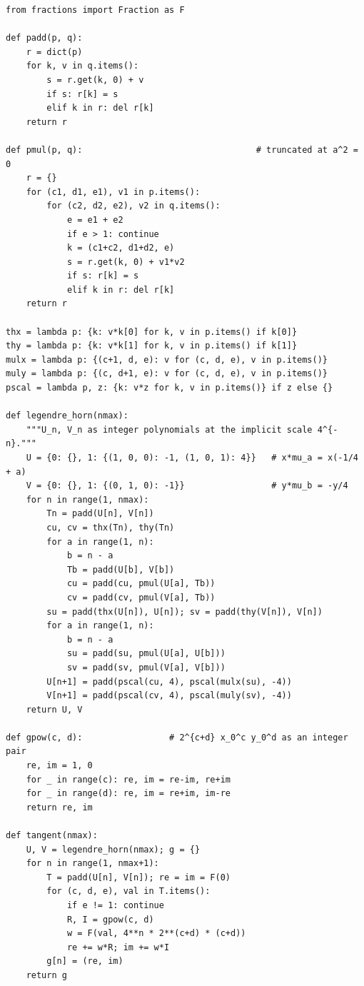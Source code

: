 \documentclass[12pt]{amsart}
\theoremstyle{definition}
\theoremstyle{remark}
\begin{document}
{\small
\begin{verbatim}
from fractions import Fraction as F

def padd(p, q):
    r = dict(p)
    for k, v in q.items():
        s = r.get(k, 0) + v
        if s: r[k] = s
        elif k in r: del r[k]
    return r

def pmul(p, q):                                  # truncated at a^2 = 0
    r = {}
    for (c1, d1, e1), v1 in p.items():
        for (c2, d2, e2), v2 in q.items():
            e = e1 + e2
            if e > 1: continue
            k = (c1+c2, d1+d2, e)
            s = r.get(k, 0) + v1*v2
            if s: r[k] = s
            elif k in r: del r[k]
    return r

thx = lambda p: {k: v*k[0] for k, v in p.items() if k[0]}
thy = lambda p: {k: v*k[1] for k, v in p.items() if k[1]}
mulx = lambda p: {(c+1, d, e): v for (c, d, e), v in p.items()}
muly = lambda p: {(c, d+1, e): v for (c, d, e), v in p.items()}
pscal = lambda p, z: {k: v*z for k, v in p.items()} if z else {}

def legendre_horn(nmax):
    """U_n, V_n as integer polynomials at the implicit scale 4^{-n}."""
    U = {0: {}, 1: {(1, 0, 0): -1, (1, 0, 1): 4}}   # x*mu_a = x(-1/4 + a)
    V = {0: {}, 1: {(0, 1, 0): -1}}                 # y*mu_b = -y/4
    for n in range(1, nmax):
        Tn = padd(U[n], V[n])
        cu, cv = thx(Tn), thy(Tn)
        for a in range(1, n):
            b = n - a
            Tb = padd(U[b], V[b])
            cu = padd(cu, pmul(U[a], Tb))
            cv = padd(cv, pmul(V[a], Tb))
        su = padd(thx(U[n]), U[n]); sv = padd(thy(V[n]), V[n])
        for a in range(1, n):
            b = n - a
            su = padd(su, pmul(U[a], U[b]))
            sv = padd(sv, pmul(V[a], V[b]))
        U[n+1] = padd(pscal(cu, 4), pscal(mulx(su), -4))
        V[n+1] = padd(pscal(cv, 4), pscal(muly(sv), -4))
    return U, V

def gpow(c, d):                 # 2^{c+d} x_0^c y_0^d as an integer pair
    re, im = 1, 0
    for _ in range(c): re, im = re-im, re+im
    for _ in range(d): re, im = re+im, im-re
    return re, im

def tangent(nmax):
    U, V = legendre_horn(nmax); g = {}
    for n in range(1, nmax+1):
        T = padd(U[n], V[n]); re = im = F(0)
        for (c, d, e), val in T.items():
            if e != 1: continue
            R, I = gpow(c, d)
            w = F(val, 4**n * 2**(c+d) * (c+d))
            re += w*R; im += w*I
        g[n] = (re, im)
    return g
\end{verbatim}
}
\end{document}
